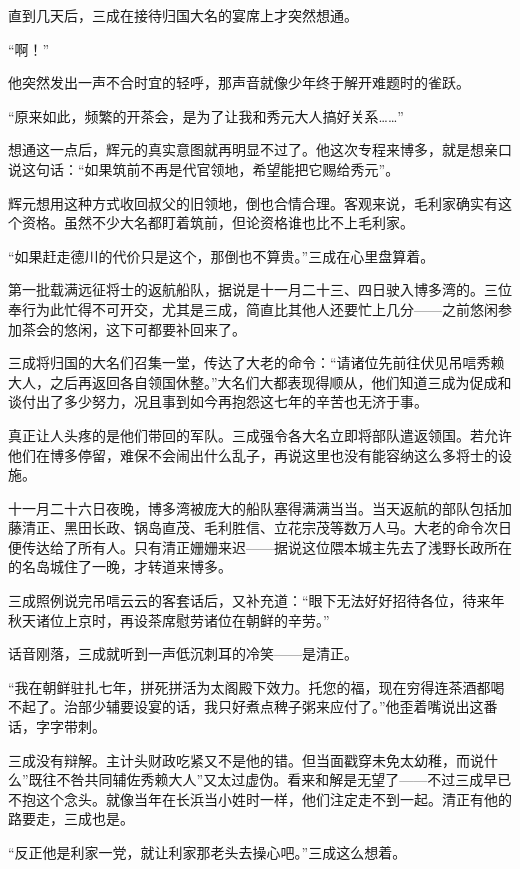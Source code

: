 \documentclass[
]{book}
\begin{document}
直到几天后，三成在接待归国大名的宴席上才突然想通。

``啊！''

他突然发出一声不合时宜的轻呼，那声音就像少年终于解开难题时的雀跃。

``原来如此，频繁的开茶会，是为了让我和秀元大人搞好关系\ldots\ldots{}''

想通这一点后，辉元的真实意图就再明显不过了。他这次专程来博多，就是想亲口说这句话：``如果筑前不再是代官领地，希望能把它赐给秀元''。

辉元想用这种方式收回叔父的旧领地，倒也合情合理。客观来说，毛利家确实有这个资格。虽然不少大名都盯着筑前，但论资格谁也比不上毛利家。

``如果赶走德川的代价只是这个，那倒也不算贵。''三成在心里盘算着。

第一批载满远征将士的返航船队，据说是十一月二十三、四日驶入博多湾的。三位奉行为此忙得不可开交，尤其是三成，简直比其他人还要忙上几分------之前悠闲参加茶会的悠闲，这下可都要补回来了。

三成将归国的大名们召集一堂，传达了大老的命令：``请诸位先前往伏见吊唁秀赖大人，之后再返回各自领国休整。''大名们大都表现得顺从，他们知道三成为促成和谈付出了多少努力，况且事到如今再抱怨这七年的辛苦也无济于事。

真正让人头疼的是他们带回的军队。三成强令各大名立即将部队遣返领国。若允许他们在博多停留，难保不会闹出什么乱子，再说这里也没有能容纳这么多将士的设施。

十一月二十六日夜晚，博多湾被庞大的船队塞得满满当当。当天返航的部队包括加藤清正、黑田长政、锅岛直茂、毛利胜信、立花宗茂等数万人马。大老的命令次日便传达给了所有人。只有清正姗姗来迟------据说这位隈本城主先去了浅野长政所在的名岛城住了一晚，才转道来博多。

三成照例说完吊唁云云的客套话后，又补充道：``眼下无法好好招待各位，待来年秋天诸位上京时，再设茶席慰劳诸位在朝鲜的辛劳。''

话音刚落，三成就听到一声低沉刺耳的冷笑------是清正。

``我在朝鲜驻扎七年，拼死拼活为太阁殿下效力。托您的福，现在穷得连茶酒都喝不起了。治部少辅要设宴的话，我只好煮点稗子粥来应付了。''他歪着嘴说出这番话，字字带刺。

三成没有辩解。主计头财政吃紧又不是他的错。但当面戳穿未免太幼稚，而说什么''既往不咎共同辅佐秀赖大人''又太过虚伪。看来和解是无望了------不过三成早已不抱这个念头。就像当年在长浜当小姓时一样，他们注定走不到一起。清正有他的路要走，三成也是。

``反正他是利家一党，就让利家那老头去操心吧。''三成这么想着。
\end{document}
